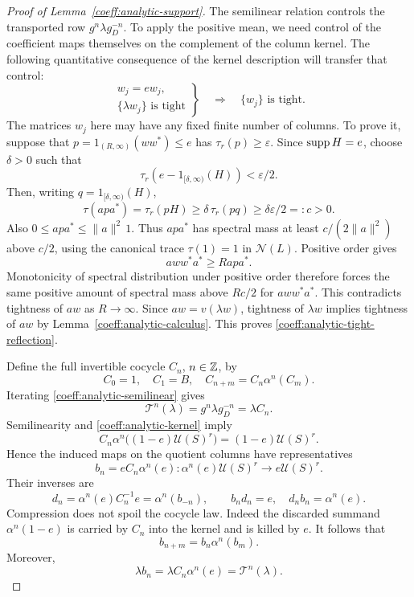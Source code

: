 \begin{proof}[Proof of Lemma~\ref{coeff:analytic-support}]
The semilinear relation controls the transported row
\(g^n\lambda g_D^{-n}\). To apply the positive mean, we need
control of the coefficient maps themselves on the complement of the
column kernel. The following quantitative consequence of the kernel
description will transfer that control:
\begin{equation}\label{coeff:analytic-tight-reflection}
 \left.
 \begin{array}{c}
 w_j=ew_j,\\
 \{\lambda w_j\}\text{ is tight}
 \end{array}\right\}
 \quad\Longrightarrow\quad
 \{w_j\}\text{ is tight}.
\end{equation}
The matrices \(w_j\) here may have any fixed finite number of columns.
To prove it, suppose that
\(p=1_{(R,\infty)}(ww^*)\le e\) has \(\tau_r(p)\ge\varepsilon\).
Since \(\operatorname{supp} H=e\), choose \(\delta>0\) such that
\[
 \tau_r(e-1_{[\delta,\infty)}(H))<\varepsilon/2.
\]
Then, writing \(q=1_{[\delta,\infty)}(H)\),
\[
 \tau(apa^*)=\tau_r(pH)
 \ge\delta\,\tau_r(pq)
 \ge\delta\varepsilon/2=:c>0.
\]
Also \(0\le apa^*\le\|a\|^2\,1\).  Thus \(apa^*\) has spectral
mass at least \(c/(2\|a\|^2)\) above \(c/2\), using the canonical
trace \(\tau(1)=1\) in \(\mathcal N(L)\).
Positive order gives
\[
 aww^*a^*\ge Rapa^*.
\]
Monotonicity of spectral distribution under positive order therefore
forces the same positive amount of spectral mass above \(Rc/2\)
for \(aww^*a^*\).  This contradicts tightness of \(aw\) as
\(R\to\infty\).  Since \(aw=v(\lambda w)\), tightness of \(\lambda w\)
implies tightness of \(aw\) by
Lemma~\ref{coeff:analytic-calculus}.  This proves
\eqref{coeff:analytic-tight-reflection}.

Define the full invertible cocycle \(C_n\), \(n\in\mathbb Z\), by
\[
 C_0=1,\quad C_1=B,\quad
 C_{n+m}=C_n\alpha^n(C_m).
\]
Iterating \eqref{coeff:analytic-semilinear} gives
\[
 \mathcal T^n(\lambda)=g^n\lambda g_D^{-n}=\lambda C_n.
\]
Semilinearity and \eqref{coeff:analytic-kernel} imply
\[
 C_n\alpha^n\bigl((1-e)\mathcal U(S)^r\bigr)
                 =(1-e)\mathcal U(S)^r.
\]
Hence the induced maps on the quotient columns have representatives
\begin{equation}\label{coeff:analytic-partial-cocycle}
 b_n=eC_n\alpha^n(e):
       \alpha^n(e)\mathcal U(S)^r\longrightarrow e\mathcal U(S)^r.
\end{equation}
Their inverses are
\[
 d_n=\alpha^n(e)C_n^{-1}e=\alpha^n(b_{-n}),\qquad
 b_nd_n=e,\quad d_nb_n=\alpha^n(e).
\]
Compression does not spoil the cocycle law.  Indeed the discarded
summand \(\alpha^n(1-e)\) is carried by \(C_n\) into the kernel and
is killed by \(e\).  It follows that
\begin{equation}\label{coeff:analytic-compressed-law}
 b_{n+m}=b_n\alpha^n(b_m).
\end{equation}
Moreover,
\begin{equation}\label{coeff:analytic-compressed-orbit}
 \lambda b_n=\lambda C_n\alpha^n(e)
            =\mathcal T^n(\lambda).
\end{equation}


\end{proof}
